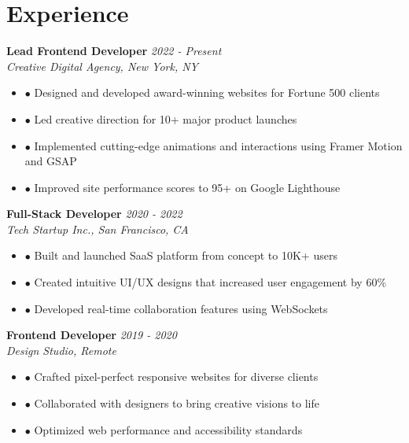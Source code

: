 \documentclass[11pt]{article}
\begin{document}
\vspace{0.2cm}

\section*{Experience}

\textbf{\color{accentcolor}Lead Frontend Developer} \hfill \textit{2022 - Present} \\
\textit{Creative Digital Agency, New York, NY}
\begin{itemize}[leftmargin=*, itemsep=2pt]
    \item {\color{primarycolor}$\bullet$} Designed and developed award-winning websites for Fortune 500 clients
    \item {\color{primarycolor}$\bullet$} Led creative direction for 10+ major product launches
    \item {\color{primarycolor}$\bullet$} Implemented cutting-edge animations and interactions using Framer Motion and GSAP
    \item {\color{primarycolor}$\bullet$} Improved site performance scores to 95+ on Google Lighthouse
\end{itemize}

\vspace{0.15cm}

\textbf{\color{accentcolor}Full-Stack Developer} \hfill \textit{2020 - 2022} \\
\textit{Tech Startup Inc., San Francisco, CA}
\begin{itemize}[leftmargin=*, itemsep=2pt]
    \item {\color{primarycolor}$\bullet$} Built and launched SaaS platform from concept to 10K+ users
    \item {\color{primarycolor}$\bullet$} Created intuitive UI/UX designs that increased user engagement by 60\%
    \item {\color{primarycolor}$\bullet$} Developed real-time collaboration features using WebSockets
\end{itemize}

\vspace{0.15cm}

\textbf{\color{accentcolor}Frontend Developer} \hfill \textit{2019 - 2020} \\
\textit{Design Studio, Remote}
\begin{itemize}[leftmargin=*, itemsep=2pt]
    \item {\color{primarycolor}$\bullet$} Crafted pixel-perfect responsive websites for diverse clients
    \item {\color{primarycolor}$\bullet$} Collaborated with designers to bring creative visions to life
    \item {\color{primarycolor}$\bullet$} Optimized web performance and accessibility standards
\end{itemize}
\end{document}
